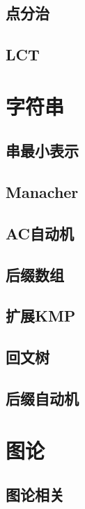 \documentclass[landscape,a4paper]{article}
\begin{document}
\begin{spacing}{0.3}
\begin{multicols}{2}
		\subsection{点分治}
		
		\subsection{LCT}
		

	\section{字符串}
		\subsection{串最小表示}
		
		\subsection{Manacher}
		
		\subsection{AC自动机}
		
		\subsection{后缀数组}
		
		\subsection{扩展KMP}
		
		\subsection{回文树}
		
		\subsection{后缀自动机}
		
	\section{图论}
		\subsection{图论相关}
		

\end{multicols}
\end{spacing}
\end{document}
